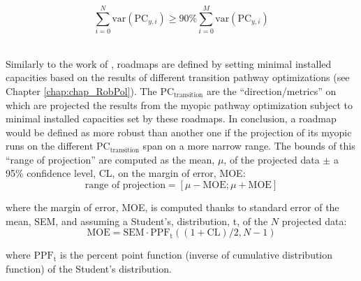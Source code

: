 \begin{equation}
\label{eq:PC_transition}
\sum_{i=0}^N\text{var}\left(\text{PC}_{y,i}\right)\geq 90\% \sum_{i=0}^M\text{var}\left(\text{PC}_{y,i}\right)
\end{equation}


\\

\noindent
Similarly to the work of \citet{moret2020overcapacity}, roadmaps are defined by setting minimal installed capacities based on the results of different transition pathway optimizations (see Chapter \ref{chap:chap_RobPol}). The $\text{PC}_{\text{transition}}$ are the ``direction/metrics'' on which are projected the results from the myopic pathway optimization subject to minimal installed capacities set by these roadmaps.  In conclusion, a roadmap would be defined as more robust than another one if the projection of its myopic runs on the different $\text{PC}_{\text{transition}}$ span on a more narrow range. The bounds of this ``range of projection'' are computed as the mean, $\mu$, of the projected data $\pm$ a 95\% confidence level, CL, on the margin of error, MOE:
$$
\text{range of projection} = [\mu-\mathrm{MOE}; \mu + \mathrm{MOE}] 
$$

\noindent
where the margin of error, MOE,  is computed thanks to standard error of the mean, SEM, and assuming a Student's, distribution, t,  of the $N$ projected data:
$$
\text{MOE} = \mathrm{SEM}\cdot \mathrm{PPF}_{\mathrm{t}}\left((1+\mathrm{CL})/2,N-1\right)
$$

\noindent
where $\mathrm{PPF}_{\mathrm{t}}$ is the percent point function (\ie inverse of cumulative distribution function) of the Student's distribution.